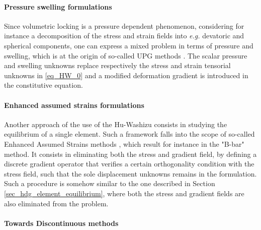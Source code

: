 \paragraph{Pressure swelling formulations}
\label{sec_pressure_swelling}

Since volumetric locking is a pressure dependent phenomenon,
considering for instance a decomposition of the stress and strain fields
into \textit{e.g.} devatoric and spherical components, one can express a
mixed problem in terms of pressure and swelling, which is at the origin
of so-called UPG methods \cite{al_akhrass_integrating_2014,
  simo_quasi-incompressible_1991, simo_variational_1985}. The scalar
pressure and swelling unknowns replace respectively the stress and
strain tensorial unknowns in \eqref{eq_HW_0} and a modified deformation
gradient is introduced in the constitutive equation.

\paragraph{Enhanced assumed strains formulations}
\label{sec_eas}

Another approach of the use of the Hu-Washizu consists in
studying the equilibrium of a single element. Such a framework falls
into the scope of so-called Enhanced Assumed Strains methods
\cite{simo_variational_1986, simo_class_1990}, which result for instance
in the "B-bar" method.
It consists in eliminating both the stress and gradient field, by defining a discrete gradient operator
that verifies a certain orthogonality condition with the stress field,
such that the sole displacement unknowns remains in the formulation.
Such a procedure is somehow similar to the one described in Section \ref{sec_hdg_element_equilibrium},
where both the stress and gradient fields are also eliminated from the problem.

\paragraph{Towards Discontinuous methods}

